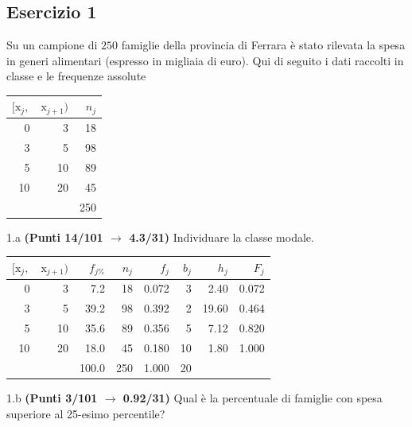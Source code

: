 \documentclass[
  11pt,
]{book}
\theoremstyle{mytheoremstyle}
\theoremstyle{mydefstyle}
\newenvironment{sol}
  {
  \begin{tcolorbox}[enhanced,breakable,arc=0.1mm,boxrule=1pt,colback=white,colframe=iblue,
  title=\bf \fontfamily{lmss}\selectfont \hspace{.5 cm} Soluzione,drop fuzzy shadow]

}{
\end{tcolorbox}
  }
\begin{document}
\subsection{Esercizio 1}\label{esercizio-1-12}

Su un campione di \(250\) famiglie della provincia di Ferrara è stato rilevata la spesa in generi alimentari (espresso in migliaia di euro). Qui di seguito i dati raccolti in classe e le frequenze assolute

\begin{table}[H]
\centering
\begin{tabular}{rrr}
\toprule
$[\text{x}_j,$ & $\text{x}_{j+1})$ & $n_j$\\
\midrule
0 & 3 & 18\\
3 & 5 & 98\\
5 & 10 & 89\\
10 & 20 & 45\\
 &  & 250\\
\bottomrule
\end{tabular}
\end{table}

1.a \textbf{(Punti 14/101 \(\rightarrow\) 4.3/31)} Individuare la classe modale.

\begin{sol}

\begin{table}[H]
\centering
\begin{tabular}{rrrrrrrr}
\toprule
$[\text{x}_j,$ & $\text{x}_{j+1})$ & $f_{j\%}$ & $n_j$ & $f_j$ & $b_j$ & $h_j$ & $F_j$\\
\midrule
0 & 3 & 7.2 & 18 & 0.072 & 3 & 2.40 & 0.072\\
3 & 5 & 39.2 & 98 & 0.392 & 2 & 19.60 & 0.464\\
5 & 10 & 35.6 & 89 & 0.356 & 5 & 7.12 & 0.820\\
10 & 20 & 18.0 & 45 & 0.180 & 10 & 1.80 & 1.000\\
 &  & 100.0 & 250 & 1.000 & 20 &  & \\
\bottomrule
\end{tabular}
\end{table}

\end{sol}

1.b \textbf{(Punti 3/101 \(\rightarrow\) 0.92/31)} Qual è la percentuale di famiglie con spesa superiore al 25-esimo percentile?
\end{document}

